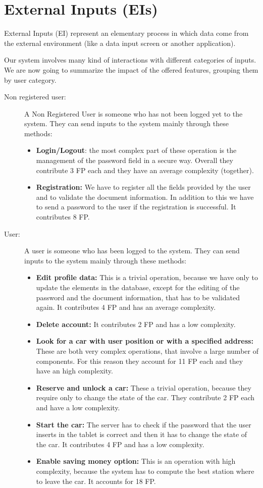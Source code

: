 \section{External Inputs (EIs)}
External Inputs (EI) represent an elementary process in which data come from the external environment (like a data input screen or another application).

Our system involves many kind of interactions with different categories of inputs.
We are now going to summarize the impact of the offered features, grouping them by user category.

\begin{description}
	\item[Non registered user:] A Non Registered User is someone who has not been logged yet to the system. They can send inputs to the system mainly through these methods: 
	\begin{itemize}
	\item \textbf{Login/Logout}: the most complex part of these operation is the management of the password field in a secure way. Overall they contribute 3 FP each and they have an average complexity (together).
	\item \textbf{Registration:} We have to register all the fields provided by the user and to validate the document information. In addition to this we have to send a password to the user if the registration is successful. It contributes 8 FP.
	\end{itemize}
	
	\item[User:] A user is someone who has been logged to the system. They can send inputs to the system mainly through these methods: 
	\begin{itemize}
	\item\textbf{Edit profile data:} This is a trivial operation, because we have only to update the elements in the database, except for the editing of the password and the document information, that has to be validated again. It contributes 4 FP and has an average complexity.
	\item\textbf{Delete account:} It contributes 2 FP and has a low complexity.
	\item\textbf{Look for a car with user position or with a specified address:} These are both very complex operations, that involve a large number of components. For this reason they account for 11 FP each and they have an high complexity.
	\item\textbf{Reserve and unlock a car:} These a trivial operation, because they require only to change the state of the car. They contribute 2 FP each and have a low complexity.
	\item\textbf{Start the car:} The server has to check if the password that the user inserts in the tablet is correct and then it has to change the state of the car. It contributes 4 FP and has a low complexity.
	\item\textbf{Enable saving money option:} This is an operation with high complexity, because the system has to compute the best station where to leave the car. It accounts for 18 FP.
	\end{itemize}
	

\end{description}
